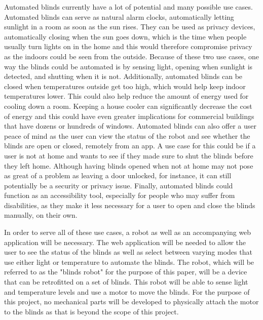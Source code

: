 \documentclass[10pt,twocolumn]{article}
\begin{document}
Automated blinds currently have a lot of potential and many possible use cases. Automated blinds can serve as natural alarm clocks, automatically letting sunlight in a room as soon as the sun rises. They can be used as privacy devices, automatically closing when the sun goes down, which is the time when people usually turn lights on in the home and this would therefore compromise privacy as the indoors could be seen from the outside. Because of these two use cases, one way the blinds could be automated is by sensing light, opening when sunlight is detected, and shutting when it is not. Additionally, automated blinds can be closed when temperatures outside get too high, which would help keep indoor temperatures lower. This could also help reduce the amount of energy used for cooling down a room. Keeping a house cooler can significantly decrease the cost of energy and this could have even greater implications for commercial buildings that have dozens or hundreds of windows. Automated blinds can also offer a user peace of mind as the user can view the status of the robot and see whether the blinds are open or closed, remotely from an app. A use case for this could be if a user is not at home and wants to see if they made sure to shut the blinds before they left home. Although having blinds opened when not at home may not pose as great of a problem as leaving a door unlocked, for instance, it can still potentially be a security or privacy issue. Finally, automated blinds could function as an accessibility tool, especially for people who may suffer from disabilities, as they make it less necessary for a user to open and close the blinds manually, on their own.

In order to serve all of these use cases, a robot as well as an accompanying web application will be necessary. The web application will be needed to allow the user to see the status of the blinds as well as select between varying modes that use either light or temperature to automate the blinds. The robot, which will be referred to as the "blinds robot" for the purpose of this paper, will be a device that can be retrofitted on a set of blinds. This robot will be able to sense light and temperature levels and use a motor to move the blinds. For the purpose of this project, no mechanical parts will be developed to physically attach the motor to the blinds as that is beyond the scope of this project.
\end{document}
